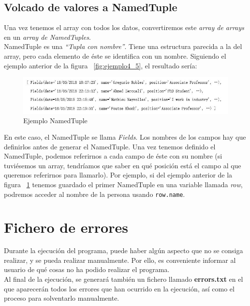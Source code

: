 \documentclass[a4paper, 12pt]{book}
\begin{document}
\subsection{Volcado de valores a NamedTuple}
\label{subsec:namedtuple}
Una vez tenemos el array con todos los datos, convertiremos este \textit{array de arrays} en un \textit{array de NamedTuples}.\\

NamedTuple es una \textit{``Tupla con nombre''}. Tiene una estructura parecida a la del array, pero cada elemento de éste se identifica con un nombre. Siguiendo el ejemplo anterior de la figura ~\ref{fig:ejemplo4_5}, el resultado sería:\\

\begin{figure}[h!]
	\centering
	\includegraphics[width=17cm, keepaspectratio]{img/ejemplo45real2}
	\caption{Ejemplo NamedTuple}
	\label{fig:ejemplo4_5Namedtuple}
\end{figure}


En este caso, el NamedTuple se llama \textit{Fields}. Los nombres de los campos hay que definirlos antes de generar el NamedTuple. Una vez tenemos definido el NamedTuple, podemos referirnos a cada campo de éste con su nombre (si tuviésemos un array, tendríamos que saber en qué posición está el campo al que queremos referirnos para llamarlo). Por ejemplo, si del ejemplo anterior de la figura ~\ref{fig:ejemplo4_5Namedtuple} tenemos guardado el primer NamedTuple en una variable llamada \textit{row}, podremos acceder al nombre de la persona usando \texttt{row.name}.

\section{Fichero de errores}
\label{sec:errores}
Durante la ejecución del programa, puede haber algún aspecto que no se consiga realizar, y se pueda realizar manualmente. Por ello, es conveniente informar al usuario de qué cosas no ha podido realizar el programa.\\

Al final de la ejecución, se generará también un fichero llamado \textbf{errors.txt} en el que aparecerán todos los errores que han ocurrido en la ejecución, así como el proceso para solventarlo manualmente.\\
\end{document}
